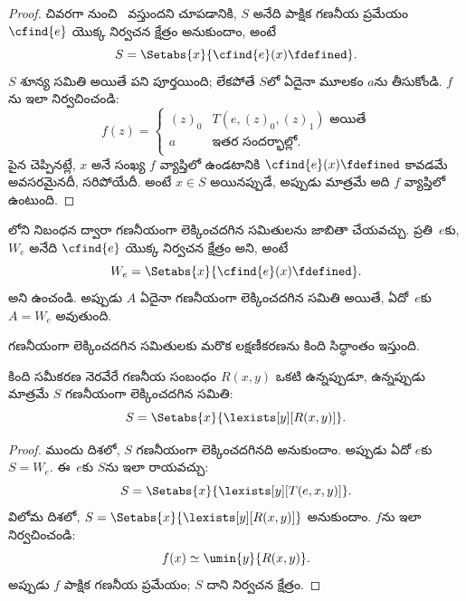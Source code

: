 \documentclass[../../../include/open-logic-section]{subfiles}
\begin{document}
\begin{proof}
చివరగా  నుంచి~ వస్తుందని చూపడానికి,
$S$ అనేది పాక్షిక గణనీయ ప్రమేయం~$\cfind{e}$ యొక్క నిర్వచన క్షేత్రం
అనుకుందాం, అంటే
\[
S=\Setabs{x}{\cfind{e}(x)\fdefined}.
\]
$S$ శూన్య సమితి అయితే పని పూర్తయింది; లేకపోతే $S$లో ఏదైనా మూలకం
$a$ను తీసుకోండి. $f$ను ఇలా నిర్వచించండి:
\[
f(z)=\begin{cases}
(z)_0 & \text{$T(e,(z)_0,(z)_1)$ అయితే} \\
a & \text{ఇతర సందర్భాల్లో.}
\end{cases}
\]
పైన చెప్పినట్లే, $x$ అనే సంఖ్య $f$ వ్యాప్తిలో ఉండటానికి
$\cfind{e}(x)\fdefined$ కావడమే అవసరమైనదీ, సరిపోయేదీ. అంటే $x\in S$
అయినప్పుడే, అప్పుడు మాత్రమే అది $f$ వ్యాప్తిలో ఉంటుంది. 
\end{proof}

లోని  నిబంధన ద్వారా గణనీయంగా
లెక్కించదగిన సమితులను జాబితా చేయవచ్చు.
ప్రతి~$e$కు, $W_e$ అనేది $\cfind{e}$ యొక్క నిర్వచన క్షేత్రం అని,
అంటే
\[
W_e=\Setabs{x}{\cfind{e}(x)\fdefined}.
\]
అని ఉంచండి. అప్పుడు $A$ ఏదైనా గణనీయంగా లెక్కించదగిన సమితి అయితే,
ఏదో~$e$కు $A=W_e$ అవుతుంది.

గణనీయంగా లెక్కించదగిన సమితులకు మరొక లక్షణీకరణను కింది సిద్ధాంతం
ఇస్తుంది.

\begin{thm}
కింది సమీకరణ నెరవేరే గణనీయ సంబంధం $R(x,y)$ ఒకటి ఉన్నప్పుడూ, ఉన్నప్పుడు మాత్రమే
$S$ గణనీయంగా లెక్కించదగిన సమితి:
\[
S=\Setabs{x}{\lexists[y][R(x,y)]}.
\]
\end{thm}

\begin{proof}
ముందు దిశలో, $S$ గణనీయంగా లెక్కించదగినది అనుకుందాం. అప్పుడు ఏదో
$e$కు $S=W_e$. ఈ~$e$కు $S$ను ఇలా రాయవచ్చు:
\[
S=\Setabs{x}{\lexists[y][T(e,x,y)]}.
\]
విలోమ దిశలో, $S=\Setabs{x}{\lexists[y][R(x,y)]}$ అనుకుందాం.
$f$ను ఇలా నిర్వచించండి:
\[
f(x)\simeq\umin{y}{R(x,y)}.
\]
అప్పుడు $f$ పాక్షిక గణనీయ ప్రమేయం; $S$ దాని నిర్వచన క్షేత్రం.
\end{proof}
\end{document}
